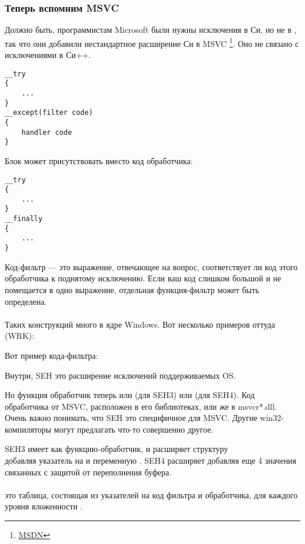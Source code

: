 \subsubsection{Теперь вспомним MSVC}

Должно быть, программистам Microsoft были нужны исключения в Си, но не в \Cpp, так что они добавили нестандартное расширение Си в MSVC
\footnote{\href{http://go.yurichev.com/17057}{MSDN}}.
Оно не связано с исключениями в Си++.

\begin{lstlisting}
__try
{
    ...
}
__except(filter code)
{
    handler code
}
\end{lstlisting}

Блок  может присутствовать вместо код обработчика:

\begin{lstlisting}
__try
{
    ...
}
__finally
{
    ...
}
\end{lstlisting}

Код-фильтр --- это выражение, отвечающее на вопрос, соответствует ли код этого обработчика к поднятому исключению.
Если ваш код слишком большой и не помещается в одно выражение, отдельная функция-фильтр может быть определена.\\
\\
Таких конструкций много в ядре Windows.
Вот несколько примеров оттуда (\ac{WRK}):





Вот пример кода-фильтра:



Внутри, SEH это расширение исключений поддерживаемых OS.

Но функция обработчик теперь или  (для SEH3) или  (для SEH4).
Код обработчика от MSVC, расположен в его библиотеках, или же в  msvcr*.dll.
Очень важно понимать, что SEH это специфичное для MSVC.
Другие win32-компиляторы могут предлагать что-то совершенно другое.


SEH3 имеет  как функцию-обработчик, и расширяет структуру \\
 добавляя указатель на 
и переменную .
SEH4 расширяет  добавляя еще 4 значения связанных с защитой от переполнения буфера.\\
\\
 это таблица, состоящая из указателей на код фильтра и обработчика, для каждого уровня вложенности .


